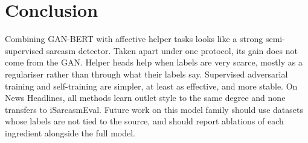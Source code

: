 \documentclass[conference]{IEEEtran}
\begin{document}
\section{Conclusion}

Combining GAN-BERT with affective helper tasks looks like a strong semi-supervised sarcasm detector. Taken apart under one protocol, its gain does not come from the GAN. Helper heads help when labels are very scarce, mostly as a regulariser rather than through what their labels say. Supervised adversarial training and self-training are simpler, at least as effective, and more stable. On News Headlines, all methods learn outlet style to the same degree and none transfers to iSarcasmEval. Future work on this model family should use datasets whose labels are not tied to the source, and should report ablations of each ingredient alongside the full model.



\end{document}
